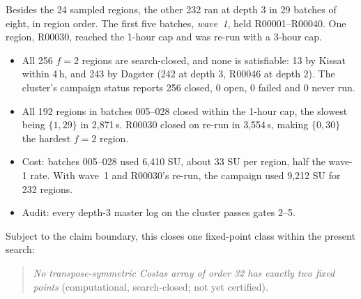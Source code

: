 \documentclass[11pt,a4paper,oneside]{report}
\theoremstyle{definition}
\newcommand{\st}[1]{\textsf{#1}}
\begin{document}
Besides the 24 sampled regions, the other 232 ran at depth 3 in 29 batches of eight, in region order.
The first five batches, \emph{wave~1}, held R00001--R00040. One region, R00030, reached the 1-hour
cap and was re-run with a 3-hour cap.

\begin{itemize}
\item All 256 $f=2$ regions are \st{search-closed}, and none is satisfiable: 13 by
Kissat within 4\,h, and 243 by Dagster (242 at depth 3, R00046 at depth 2). The cluster's
campaign status reports 256 closed, 0 open, 0 failed and 0 never run.
\item All 192 regions in batches 005--028 closed within the 1-hour cap, the slowest
being $\{1,29\}$ in 2{,}871\,s. R00030 closed on re-run in 3{,}554\,s, making $\{0,30\}$ the
hardest $f=2$ region.
\item Cost: batches 005--028 used 6{,}410 SU, about 33 SU per region, half the wave-1
rate. With wave~1 and R00030's re-run, the campaign used 9{,}212 SU for 232 regions.
\item Audit: every depth-3 master log on the cluster passes gates 2--5.
\end{itemize}

Subject to the claim boundary, this closes one fixed-point class within the present search:
\begin{quote}
\emph{No transpose-symmetric Costas array of order 32 has exactly two fixed points}
(computational, \st{search-closed}; not yet certified).
\end{quote}
\end{document}
